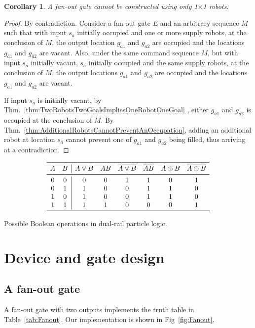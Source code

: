 \documentclass[letterpaper, 10 pt, conference]{ieeeconf}
\newtheorem{corollary}[theorem]{Corollary}
\begin{document}
\begin{corollary}
A  {\sc fan-out} gate cannot be constructed using only 1$\times$1 robots.
\end{corollary}
\begin{proof} By contradiction.
Consider a  {\sc fan-out} gate $E$ and an arbitrary sequence $M$ such that with input $s_{a}$ initially occupied and one or more supply robots, at the conclusion of  $M$, the output location $g_{a1}$ and $g_{a2}$ are occupied and the locations  $g_{\bar{a}1}$ and $g_{\bar{a}2}$ are vacant.  Also, under the same command sequence $M$, but with input $s_{a}$ initially vacant, $s_{\bar{a}}$ initially occupied and the same supply robots, at the conclusion of $M$, the output locations  $g_{\bar{a}1}$ and $g_{\bar{a}2}$ are occupied and the locations  $g_{a1}$ and $g_{a2}$  are vacant. 


 If input $s_{a}$ is initially vacant, by Thm.~\ref{thm:TwoRobotsTwoGoalsImpliesOneRobotOneGoal} , either  $g_{a1}$ and $g_{a2}$ is occupied at the conclusion of $M$.  By Thm.~\ref{thm:AdditionalRobotsCannotPreventAnOccupation}, adding an additional robot at location $s_{\bar{a}}$ cannot prevent one of $g_{a1}$ and $g_{a2}$ being filled, thus arriving at a contradiction.
 \end{proof}




\begin{table}
\begin{displaymath}
\begin{array}{cc|cccccc}
\toprule
   A
 & B
 & A\lor{}B
 & AB
 & \overline{A\lor{}B}
 & \overline{AB}
 & A\oplus B
 & \overline{A\oplus B} \\
\midrule
0 & 0 & 0 & 0 & 1 & 1 & 0 & 1 \\
0 & 1 & 1 & 0 & 0 & 1 & 1 & 0 \\
1 & 0 & 1 & 0 & 0 & 1 & 1 & 0 \\
1 & 1 & 1 & 1 & 0 & 0 & 0 & 1 \\
\bottomrule
\end{array}
\end{displaymath}
  \caption{Possible Boolean operations in dual-rail particle logic.}
  \label{tab:dualRailParticleLogic}
\end{table}
  
  \section{Device and gate design}
  
  \subsection{A {\sc fan-out} gate}\label{sec:FanOut}
A {\sc fan-out} gate with two outputs implements the truth table in Table~\ref{tab:Fanout}.  Our implementation is shown in Fig~\ref{fig:Fanout}.
  
\end{document}
